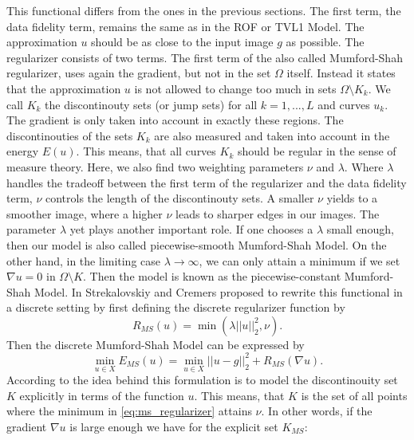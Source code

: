     This functional differs from the ones in the previous sections. The first term, the data fidelity term, remains the same as in the ROF or TVL1 Model. The approximation $u$ should be as close to the input image $g$ as possible. The regularizer consists of two terms. The first term of the also called Mumford-Shah regularizer, uses again the gradient, but not in the set $\Omega$ itself. Instead it states that the approximation $u$ is not allowed to change too much in sets $\Omega \setminus K_{k}$. We call $K_{k}$ the discontinouty sets (or jump sets) for all $k = 1, ..., L$ and curves $u_{k}$. The gradient is only taken into account in exactly these regions. The discontinouties of the sets $K_{k}$ are also measured and taken into account in the energy $E(u)$. This means, that all curves $K_{k}$ should be regular in the sense of measure theory. Here, we also find two weighting parameters $\nu$ and $\lambda$. Where $\lambda$ handles the tradeoff between the first term of the regularizer and the data fidelity term, $\nu$ controls the length of the discontinouty sets. A smaller $\nu$ yields to a smoother image, where a higher $\nu$ leads to sharper edges in our images. The parameter $\lambda$ yet plays another important role. If one chooses a $\lambda$ small enough, then our model is also called piecewise-smooth Mumford-Shah Model. On the other hand, in the limiting case $\lambda \longrightarrow \infty$, we can only attain a minimum if we set $\nabla u = 0$ in $\Omega \setminus K$. Then the model is known as the piecewise-constant Mumford-Shah Model.
    In \cite{Strekalovskiy-Cremers-eccv14} Strekalovskiy and Cremers proposed to rewrite this functional in a discrete setting by first defining the discrete regularizer function by
        \begin{equation}
            R_{MS}(u) = \min(\lambda||u||_{2}^{2},\nu).
        \label{eq:ms_regularizer}
        \end{equation}
    Then the discrete Mumford-Shah Model can be expressed by
        \begin{equation}
            \min_{u \in X} E_{MS}(u) = \min_{u \in X} ||u - g||_{2}^{2} + R_{MS}(\nabla u).
        \label{eq:discrete_mumford_shah_functional}
        \end{equation}
    According to \cite{Strekalovskiy-Cremers-eccv14} the idea behind this formulation is to model the discontinouity set $K$ explicitly in terms of the function $u$. This means, that $K$ is the set of all points where the minimum in \ref{eq:ms_regularizer} attains $\nu$. In other words, if the gradient $\nabla u$ is large enough we have for the explicit set $K_{MS}$:
